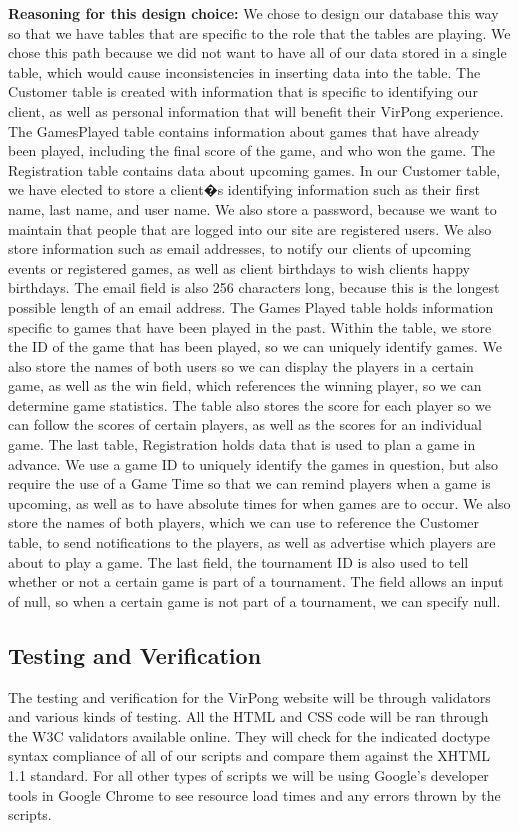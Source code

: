 \textbf{Reasoning for this design choice:}
    We chose to design our database this way so that we have tables that are specific to the role that the tables are playing. We chose this path because we did not want to have all of our data stored in a single table, which would cause inconsistencies in inserting data into the table. The Customer table is created with information that is specific to identifying our client, as well as personal information that will benefit their VirPong experience. The GamesPlayed table contains information about games that have already been played, including the final score of the game, and who won the game. The Registration table contains data about upcoming games.
    In our Customer table, we have elected to store a client�s identifying information such as their first name, last name, and user name. We also store a password, because we want to maintain that people that are logged into our site are registered users. We also store information such as email addresses, to notify our clients of upcoming events or registered games, as well as client birthdays to wish clients happy birthdays. The email field is also 256 characters long, because this is the longest possible length of an email address.
    The Games Played table holds information specific to games that have been played in the past. Within the table, we store the ID of the game that has been played, so we can uniquely identify games. We also store the names of both users so we can display the players in a certain game, as well as the win field, which references the winning player, so we can determine game statistics. The table also stores the score for each player so we can follow the scores of certain players, as well as the scores for an individual game.
    The last table, Registration holds data that is used to plan a game in advance. We use a game ID to uniquely identify the games in question, but also require the use of a Game Time so that we can remind players when a game is upcoming, as well as to have absolute times for when games are to occur. We also store the names of both players, which we can use to reference the Customer table, to send notifications to the players, as well as advertise which players are about to play a game. The last field, the tournament ID is also used to tell whether or not a certain game is part of a tournament. The field allows an input of null, so when a certain game is not part of a tournament, we can specify null.
	
	
	\subsection{Testing and Verification}
		The testing and verification for the VirPong website will be through validators and various kinds of testing. All the HTML and CSS code will be ran through the W3C validators available online. They will check for the indicated doctype syntax compliance of all of our scripts and compare them against the XHTML 1.1 standard. For all other types of scripts we will be using Google’s developer tools in Google Chrome to see resource load times and any errors thrown by the scripts.

